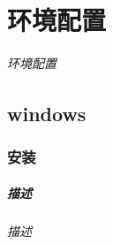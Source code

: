 \chapter{环境配置}
\subparagraph{
    环境配置
}

\section{windows}
\subsection{安装}
\newpage
\paragraph{
    描述
}
\subparagraph{
    描述
}